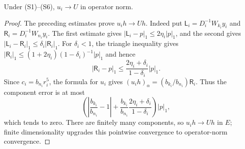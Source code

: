 \begin{lemma}\label{lem:trace-sensor-lift-limit}
Under (S1)--(S6), $u_i\to U$ in operator norm.
\end{lemma}
\nopagebreak
\begin{proof}
The preceding estimates prove $u_i h\to Uh$. Indeed put
$\mathsf L_i=D_i^{-1}W_{k_i}y_i$ and $\mathsf R_i=D_i^{-1}W_{n_i}y_i$.
The first estimate gives $|\mathsf L_i-p|_1\le2\eta_i|p|_1$, and the second
gives $|\mathsf L_i-\mathsf R_i|_1\le\delta_i|\mathsf R_i|_1$. For $\delta_i<1$, the triangle
inequality gives $|\mathsf R_i|_1\le(1+2\eta_i)(1-\delta_i)^{-1}|p|_1$ and hence
\[
 |\mathsf R_i-p|_1\le\frac{2\eta_i+\delta_i}{1-\delta_i}|p|_1.
\]
Since $c_i=b_{n_i}r_i^5$, the formula for $u_i$ gives
$(u_i h)_\alpha=(b_{k_i}/b_{n_i})\mathsf R_i$. Thus the component error is at
most
\[
 \left(\left|\frac{b_{k_i}}{b_{n_i}}-1\right|
 +\frac{b_{k_i}}{b_{n_i}}
   \frac{2\eta_i+\delta_i}{1-\delta_i}\right)|p|_1,
\]
which tends to zero. There are finitely many components, so $u_i h\to Uh$
in $E$; finite dimensionality upgrades this pointwise convergence to
operator-norm convergence.
\end{proof}

